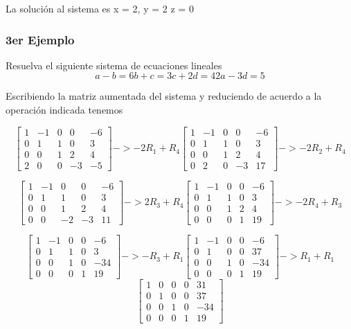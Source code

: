 \documentclass{article}
\begin{document}
La solución al sistema es 
x = 2, y = 2 z = 0

\subsubsection{3er Ejemplo}

Resuelva el siguiente sistema de ecuaciones lineales
\[
    a - b = 6
    b + c = 3
    c + 2d = 4
    2a - 3d = 5
\]

Escribiendo la matriz aumentada del sistema y reduciendo de acuerdo a la operación indicada tenemos

\[
    \begin{bmatrix}1 & -1 & 0 & 0 & -6  \\ 0 & 1 & 1 & 0 & 3 \\ 0 & 0 & 1 & 2 & 4  \\ 2 & 0 & 0 & -3 & -5 \end{bmatrix}
    -> -2R_1 + R_4
    \begin{bmatrix}1 & -1 & 0 & 0 & -6  \\ 0 & 1 & 1 & 0 & 3 \\ 0 & 0 & 1 & 2 & 4  \\ 0 & 2 & 0 & -3 & 17 \end{bmatrix}
    -> -2R_2 + R_4
\]

\[
    \begin{bmatrix} 1 & -1 & 0 & 0 & -6  \\ 0 & 1 & 1 & 0 & 3 \\ 0 & 0 & 1 & 2 & 4  \\ 0 & 0 & -2 & -3 & 11 \end{bmatrix}
    -> 2R_3 + R_4
    \begin{bmatrix}1 & -1 & 0 & 0 & -6  \\ 0 & 1 & 1 & 0 & 3 \\ 0 & 0 & 1 & 2 & 4  \\ 0 & 0 & 0 & 1 & 19 \end{bmatrix}
    -> -2R_4 + R_3
\]

\[
    \begin{bmatrix} 1 & -1 & 0 & 0 & -6  \\ 0 & 1 & 1 & 0 & 3 \\ 0 & 0 & 1 & 0 & -34  \\ 0 & 0 & 0 & 1 & 19 \end{bmatrix}
    -> -R_3 + R_1
    \begin{bmatrix} 1 & -1 & 0 & 0 & -6  \\ 0 & 1 & 0 & 0 & 37 \\ 0 & 0 & 1 & 0 & -34  \\ 0 & 0 & 0 & 1 & 19 \end{bmatrix}
    -> R_1 + R_1
\]
\[
    \begin{bmatrix} 1 & 0 & 0 & 0 & 31  \\ 0 & 1 & 0 & 0 & 37 \\ 0 & 0 & 1 & 0 & -34  \\ 0 & 0 & 0 & 1 & 19 \end{bmatrix}
\]
\end{document}
